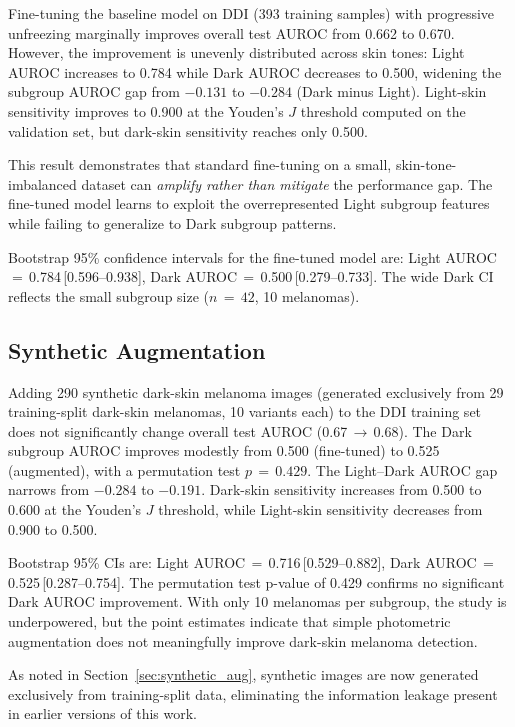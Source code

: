 Fine-tuning the baseline model on DDI (393 training samples) with progressive unfreezing marginally improves overall test AUROC from 0.662 to 0.670. However, the improvement is unevenly distributed across skin tones: Light AUROC increases to 0.784 while Dark AUROC decreases to 0.500, widening the subgroup AUROC gap from $-0.131$ to $-0.284$ (Dark minus Light). Light-skin sensitivity improves to 0.900 at the Youden's $J$ threshold computed on the validation set, but dark-skin sensitivity reaches only 0.500.

This result demonstrates that standard fine-tuning on a small, skin-tone-imbalanced dataset can \emph{amplify rather than mitigate} the performance gap. The fine-tuned model learns to exploit the overrepresented Light subgroup features while failing to generalize to Dark subgroup patterns.

Bootstrap 95\% confidence intervals for the fine-tuned model are: Light AUROC\,$=$\,0.784\,[0.596--0.938], Dark AUROC\,$=$\,0.500\,[0.279--0.733]. The wide Dark CI reflects the small subgroup size ($n\,{=}\,42$, 10 melanomas).

\subsection{Synthetic Augmentation}

Adding 290 synthetic dark-skin melanoma images (generated exclusively from 29 training-split dark-skin melanomas, 10 variants each) to the DDI training set does not significantly change overall test AUROC (0.67\,$\rightarrow$\,0.68). The Dark subgroup AUROC improves modestly from 0.500 (fine-tuned) to 0.525 (augmented), with a permutation test $p\,{=}\,0.429$. The Light--Dark AUROC gap narrows from $-0.284$ to $-0.191$. Dark-skin sensitivity increases from 0.500 to 0.600 at the Youden's $J$ threshold, while Light-skin sensitivity decreases from 0.900 to 0.500.

Bootstrap 95\% CIs are: Light AUROC\,$=$\,0.716\,[0.529--0.882], Dark AUROC\,$=$\,0.525\,[0.287--0.754]. The permutation test p-value of 0.429 confirms no significant Dark AUROC improvement. With only 10 melanomas per subgroup, the study is underpowered, but the point estimates indicate that simple photometric augmentation does not meaningfully improve dark-skin melanoma detection.

As noted in Section~\ref{sec:synthetic_aug}, synthetic images are now generated exclusively from training-split data, eliminating the information leakage present in earlier versions of this work.

